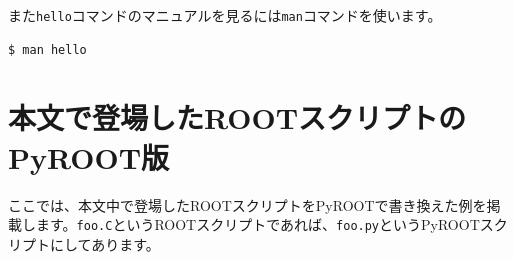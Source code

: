 また\texttt{hello}コマンドのマニュアルを見るには\texttt{man}コマンドを使います。

\begin{lstlisting}[language=bash]
$ man hello
\end{lstlisting}

\chapter{本文で登場したROOTスクリプトのPyROOT版}
ここでは、本文中で登場したROOTスクリプトをPyROOTで書き換えた例を掲載します。\texttt{foo.C}というROOTスクリプトであれば、\texttt{foo.py}というPyROOTスクリプトにしてあります。

\begin{NoFloat}

\end{NoFloat}
